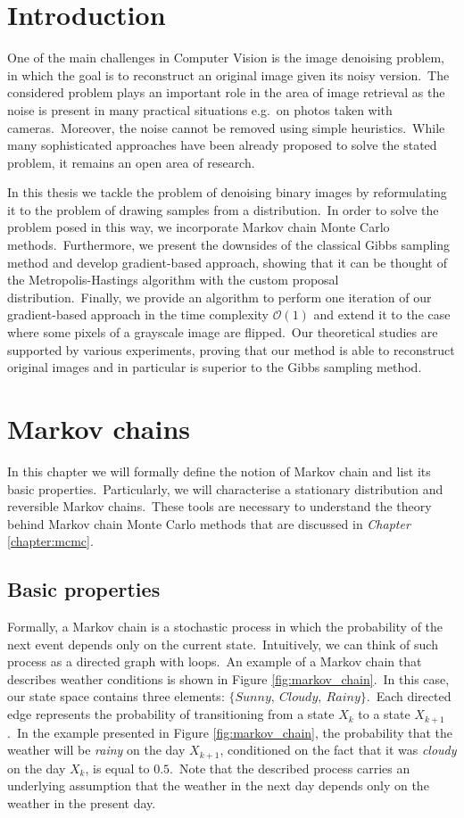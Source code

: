 \documentclass[shortabstract, english, lic]{iithesis}
\author         {Dawid Wegner}
\date           {29 sierpnia 2021}
\newcommand\numberedchapter[1]{\setlength\topskip{3cm}\chapter{#1}\setlength\topskip{0cm}}
\theoremstyle{default_theorem_style}\newtheorem{theorem}{Theorem}
\theoremstyle{default_theorem_style}\newtheorem{definition}{Definition}
\begin{document}
\numberedchapter{Introduction}

One of the main challenges in Computer Vision is the image denoising problem, in which the goal is to reconstruct an
original image given its noisy version.\ The considered problem plays an important role in the area of image
retrieval as the noise is present in many practical situations e.g.\ on photos taken with cameras.\ Moreover, the noise
cannot be removed using simple heuristics.\ While many sophisticated approaches have been already proposed to solve
the stated problem, it remains an open area of research.\newline

\noindent In this thesis we tackle the problem of denoising binary images by reformulating it to the problem of
drawing samples from a distribution.\ In order to solve the problem posed in this way, we incorporate Markov chain
Monte Carlo methods.\ Furthermore, we present the downsides of the classical Gibbs sampling method and develop
gradient-based approach, showing that it can be thought of the Metropolis-Hastings algorithm with the custom proposal
distribution.\ Finally, we provide an algorithm to perform one iteration of our gradient-based approach in the
time complexity $\mathcal{O}(1)$ and extend it to the case where some pixels of a grayscale image are
flipped.\ Our theoretical studies are supported by various experiments, proving that our method is able to
reconstruct original images and in particular is superior to the Gibbs sampling method.

\numberedchapter{Markov chains}

In this chapter we will formally define the notion of Markov chain and list its basic properties.\ Particularly,
we will characterise a stationary distribution and reversible Markov chains.\ These tools are necessary to understand
the theory behind Markov chain Monte Carlo methods that are discussed in \textit{Chapter} \ref{chapter:mcmc}.

\section{Basic properties}

Formally, a Markov chain is a stochastic process in which the probability of the next event depends only on the current
state.\ Intuitively, we can think of such process as a directed graph with loops.\ An example of a Markov chain that
describes weather conditions is shown in Figure \ref{fig:markov_chain}.\ In this case, our state space contains three
elements: $\{Sunny,\ Cloudy,\ Rainy\}$.\ Each directed edge represents the probability of transitioning from a state
$X_k$ to a state $X_{k + 1}$.\ In the example presented in Figure \ref{fig:markov_chain}, the probability that the
weather will be \textit{rainy} on the day $X_{k + 1}$, conditioned on the fact that it was \textit{cloudy} on the
day $X_k$, is equal to $0.5$.\ Note that the described process carries an underlying assumption that the weather in
the next day depends only on the weather in the present day.\newline
\end{document}
